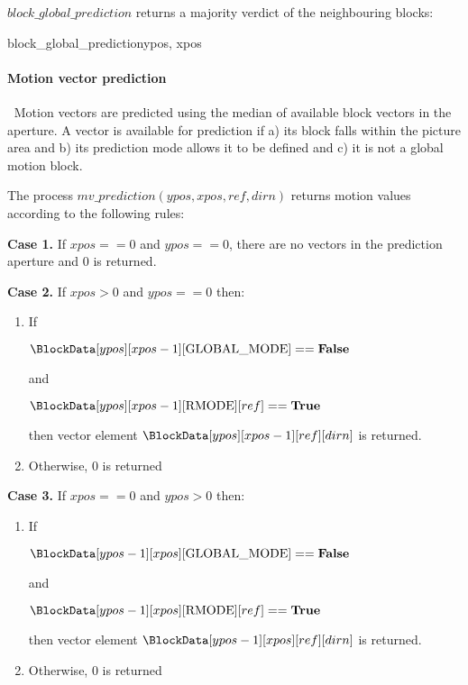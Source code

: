 $block\_global\_prediction$ returns a majority verdict of the neighbouring blocks:

\begin{pseudo}{block\_global\_prediction}{ypos, xpos}
    \bsRET{\false}
    \bsRET{\BlockData[ypos][xpos-1][\GMode]}
    \bsRET{\BlockData[ypos-1][xpos][\GMode]}
\bsEND


\end{pseudo}

\paragraph{Motion vector prediction}
\label{mvprediction}
$\ $\newline
Motion vectors are predicted using the median of available block vectors in the aperture. A vector is available for
prediction if a) its block falls within the picture area and b) its prediction mode allows it to be defined and c) it
is not a global motion block. 

The process $mv\_prediction(ypos, xpos, ref, dirn)$ returns motion values according to
the following rules:

{\bf Case 1.}  If $xpos==0$ and $ypos==0$, there are no vectors in the prediction aperture and
 $0$ is returned.

{\bf Case 2.} If $xpos>0$ and $ypos==0$ then:
\begin{enumerate}
   \item If 

$\BlockData[ypos][xpos-1][\GMode]==\false$ 

and 

$\BlockData[ypos][xpos-1][\RMode][ref]==\true$ 

then vector element $\BlockData[ypos][xpos-1][ref][dirn]$ is returned.

   \item Otherwise, $0$ is returned
\end{enumerate}

{\bf Case 3.} If $xpos==0$ and $ypos>0$ then:
\begin{enumerate}
   \item If 

$\BlockData[ypos-1][xpos][\GMode]==\false$ 

and 

$\BlockData[ypos-1][xpos][\RMode][ref]==\true$

then vector element $\BlockData[ypos-1][xpos][ref][dirn]$ is returned.

   \item Otherwise, $0$ is returned
\end{enumerate}

